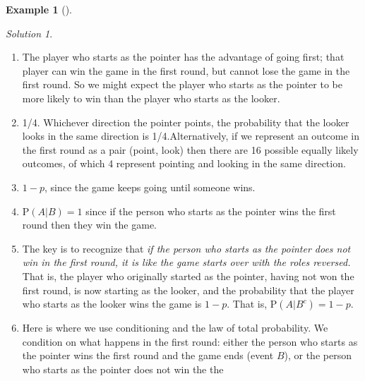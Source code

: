 \documentclass[
  letterpaper,
  DIV=11,
  numbers=noendperiod]{scrreprt}
\providecommand{\tightlist}{%
  \setlength{\itemsep}{0pt}\setlength{\parskip}{0pt}}
\theoremstyle{plain}
\theoremstyle{definition}
\newtheorem{example}{Example}[chapter]
\theoremstyle{definition}
\theoremstyle{definition}
\theoremstyle{remark}
\newtheorem{refsolution}{Solution}[chapter]
\begin{document}
\begin{tcolorbox}[enhanced jigsaw, opacityback=0, left=2mm, colframe=quarto-callout-note-color-frame, toprule=.15mm, breakable, colback=white, leftrule=.75mm, arc=.35mm, rightrule=.15mm, bottomrule=.15mm]
\begin{example}[]
\end{example}

\end{tcolorbox}

\begin{tcolorbox}[enhanced jigsaw, opacityback=0, rightrule=.15mm, coltitle=black, colframe=quarto-callout-tip-color-frame, toprule=.15mm, colbacktitle=quarto-callout-tip-color!10!white, opacitybacktitle=0.6, left=2mm, toptitle=1mm, breakable, title={Solution (click to expand)}, bottomtitle=1mm, colback=white, leftrule=.75mm, titlerule=0mm, arc=.35mm, bottomrule=.15mm]

\begin{refsolution}
\leavevmode

\begin{enumerate}
\def\labelenumi{\arabic{enumi}.}
\tightlist
\item
  The player who starts as the pointer has the advantage of going first;
  that player can win the game in the first round, but cannot lose the
  game in the first round. So we might expect the player who starts as
  the pointer to be more likely to win than the player who starts as the
  looker.
\item
  1/4. Whichever direction the pointer points, the probability that the
  looker looks in the same direction is 1/4.Alternatively, if we
  represent an outcome in the first round as a pair (point, look) then
  there are 16 possible equally likely outcomes, of which 4 represent
  pointing and looking in the same direction.
\item
  \(1-p\), since the game keeps going until someone wins.
\item
  \(\textrm{P}(A|B)=1\) since if the person who starts as the pointer
  wins the first round then they win the game.
\item
  The key is to recognize that \emph{if the person who starts as the
  pointer does not win in the first round, it is like the game starts
  over with the roles reversed.} That is, the player who originally
  started as the pointer, having not won the first round, is now
  starting as the looker, and the probability that the player who starts
  as the looker wins the game is \(1-p\). That is,
  \(\textrm{P}(A|B^c) = 1-p\).
\item
  Here is where we use conditioning and the law of total probability. We
  condition on what happens in the first round: either the person who
  starts as the pointer wins the first round and the game ends (event
  \(B\)), or the person who starts as the pointer does not win the the

\end{enumerate}
\end{refsolution}
\end{tcolorbox}
\end{document}
